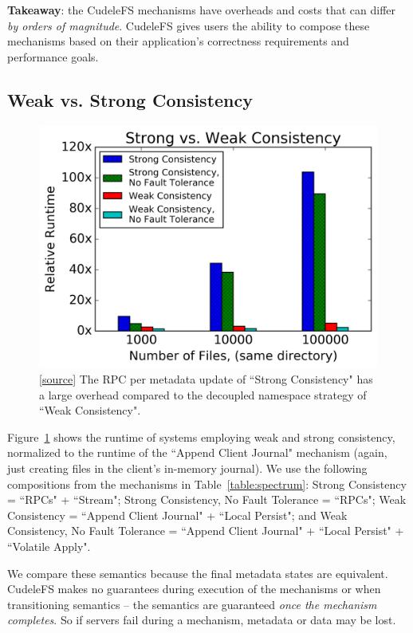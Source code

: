 \noindent\textbf{Takeaway}: the CudeleFS mechanisms have overheads and costs
that can differ {\it by orders of magnitude}. CudeleFS gives users the ability
to compose these mechanisms based on their application's correctness
requirements and performance goals.

\subsection{Weak vs. Strong Consistency}
\begin{figure}[tb]
\centering
\includegraphics[width=1.0\linewidth]{graphs/slowdown-strong-v-weak.png}
\caption{
[\href{https://...}{source}]
The RPC per metadata update of ``Strong Consistency" has a large
overhead compared to the decoupled namespace strategy of ``Weak
Consistency".\label{fig:slowdown-strong-weak}}
\end{figure}

Figure~\ref{fig:slowdown-strong-weak} shows the runtime of systems employing
weak and strong consistency, normalized to the runtime of the ``Append Client Journal"
mechanism (again, just creating files in the client's in-memory journal).  We
use the following compositions from the mechanisms in
Table~\ref{table:spectrum}:  Strong Consistency = ``RPCs" + ``Stream"; Strong
Consistency, No Fault Tolerance = ``RPCs"; Weak Consistency = ``Append Client Journal" +
``Local Persist"; and Weak Consistency, No Fault Tolerance = ``Append Client Journal" +
``Local Persist" + ``Volatile Apply".

We compare these semantics because the final metadata states are equivalent.
CudeleFS makes no guarantees during execution of the mechanisms or when
transitioning semantics -- the semantics are guaranteed {\it once the mechanism
completes}. So if servers fail during a mechanism, metadata or data may be
lost.

